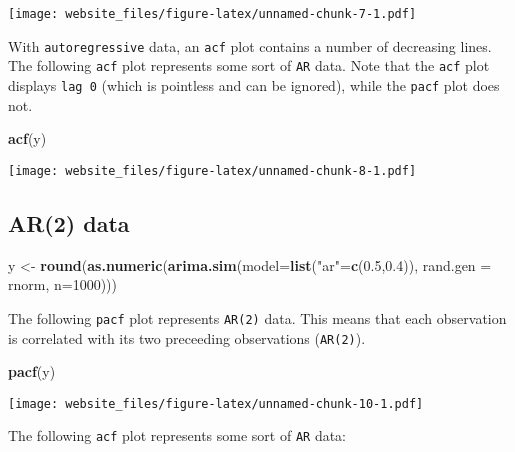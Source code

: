 \documentclass[]{book}
\newenvironment{Shaded}{\begin{snugshade}}{\end{snugshade}}
\newcommand{\KeywordTok}[1]{\textcolor[rgb]{0.13,0.29,0.53}{\textbf{#1}}}
\newcommand{\DataTypeTok}[1]{\textcolor[rgb]{0.13,0.29,0.53}{#1}}
\newcommand{\DecValTok}[1]{\textcolor[rgb]{0.00,0.00,0.81}{#1}}
\newcommand{\FloatTok}[1]{\textcolor[rgb]{0.00,0.00,0.81}{#1}}
\newcommand{\StringTok}[1]{\textcolor[rgb]{0.31,0.60,0.02}{#1}}
\newcommand{\NormalTok}[1]{#1}
\begin{document}
\texttt{[image: website\_files/figure-latex/unnamed-chunk-7-1.pdf]}

\newpage

With \texttt{autoregressive} data, an \texttt{acf} plot contains a
number of decreasing lines. The following \texttt{acf} plot represents
some sort of \texttt{AR} data. Note that the \texttt{acf} plot displays
\texttt{lag\ 0} (which is pointless and can be ignored), while the
\texttt{pacf} plot does not.

\begin{Shaded}
\begin{Highlighting}[]
\KeywordTok{acf}\NormalTok{(y)}
\end{Highlighting}
\end{Shaded}

\texttt{[image: website\_files/figure-latex/unnamed-chunk-8-1.pdf]}

\newpage 

\subsection{AR(2) data}\label{ar2-data}

\begin{Shaded}
\begin{Highlighting}[]
\NormalTok{y <-}\StringTok{ }\KeywordTok{round}\NormalTok{(}\KeywordTok{as.numeric}\NormalTok{(}\KeywordTok{arima.sim}\NormalTok{(}\DataTypeTok{model=}\KeywordTok{list}\NormalTok{(}\StringTok{"ar"}\NormalTok{=}\KeywordTok{c}\NormalTok{(}\FloatTok{0.5}\NormalTok{,}\FloatTok{0.4}\NormalTok{)), }\DataTypeTok{rand.gen =}\NormalTok{ rnorm, }\DataTypeTok{n=}\DecValTok{1000}\NormalTok{)))}
\end{Highlighting}
\end{Shaded}

The following \texttt{pacf} plot represents \texttt{AR(2)} data. This
means that each observation is correlated with its two preceeding
observations (\texttt{AR(2)}).

\begin{Shaded}
\begin{Highlighting}[]
\KeywordTok{pacf}\NormalTok{(y)}
\end{Highlighting}
\end{Shaded}

\texttt{[image: website\_files/figure-latex/unnamed-chunk-10-1.pdf]}

\newpage

The following \texttt{acf} plot represents some sort of \texttt{AR}
data:
\end{document}
